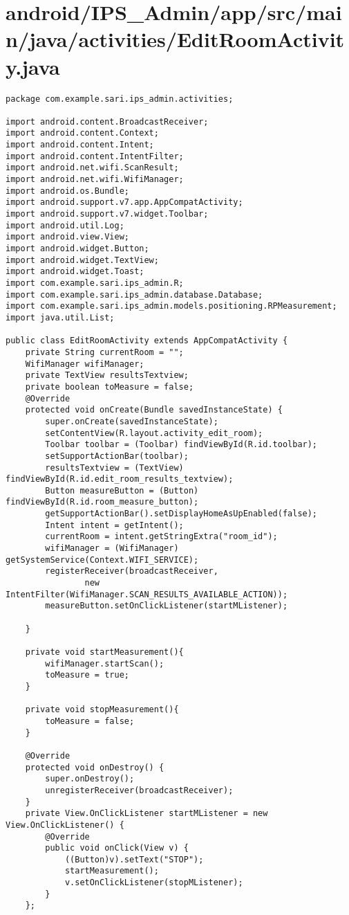 \section{android/IPS\_Admin/app/src/main/java/activities/EditRoomActivity.java}
\begin{lstlisting}package com.example.sari.ips_admin.activities;

import android.content.BroadcastReceiver;
import android.content.Context;
import android.content.Intent;
import android.content.IntentFilter;
import android.net.wifi.ScanResult;
import android.net.wifi.WifiManager;
import android.os.Bundle;
import android.support.v7.app.AppCompatActivity;
import android.support.v7.widget.Toolbar;
import android.util.Log;
import android.view.View;
import android.widget.Button;
import android.widget.TextView;
import android.widget.Toast;
import com.example.sari.ips_admin.R;
import com.example.sari.ips_admin.database.Database;
import com.example.sari.ips_admin.models.positioning.RPMeasurement;
import java.util.List;

public class EditRoomActivity extends AppCompatActivity {
    private String currentRoom = "";
    WifiManager wifiManager;
    private TextView resultsTextview;
    private boolean toMeasure = false;
    @Override
    protected void onCreate(Bundle savedInstanceState) {
        super.onCreate(savedInstanceState);
        setContentView(R.layout.activity_edit_room);
        Toolbar toolbar = (Toolbar) findViewById(R.id.toolbar);
        setSupportActionBar(toolbar);
        resultsTextview = (TextView) findViewById(R.id.edit_room_results_textview);
        Button measureButton = (Button) findViewById(R.id.room_measure_button);
        getSupportActionBar().setDisplayHomeAsUpEnabled(false);
        Intent intent = getIntent();
        currentRoom = intent.getStringExtra("room_id");
        wifiManager = (WifiManager) getSystemService(Context.WIFI_SERVICE);
        registerReceiver(broadcastReceiver,
                new IntentFilter(WifiManager.SCAN_RESULTS_AVAILABLE_ACTION));
        measureButton.setOnClickListener(startMListener);

    }

    private void startMeasurement(){
        wifiManager.startScan();
        toMeasure = true;
    }

    private void stopMeasurement(){
        toMeasure = false;
    }

    @Override
    protected void onDestroy() {
        super.onDestroy();
        unregisterReceiver(broadcastReceiver);
    }
    private View.OnClickListener startMListener = new View.OnClickListener() {
        @Override
        public void onClick(View v) {
            ((Button)v).setText("STOP");
            startMeasurement();
            v.setOnClickListener(stopMListener);
        }
    };


\end{lstlisting}
